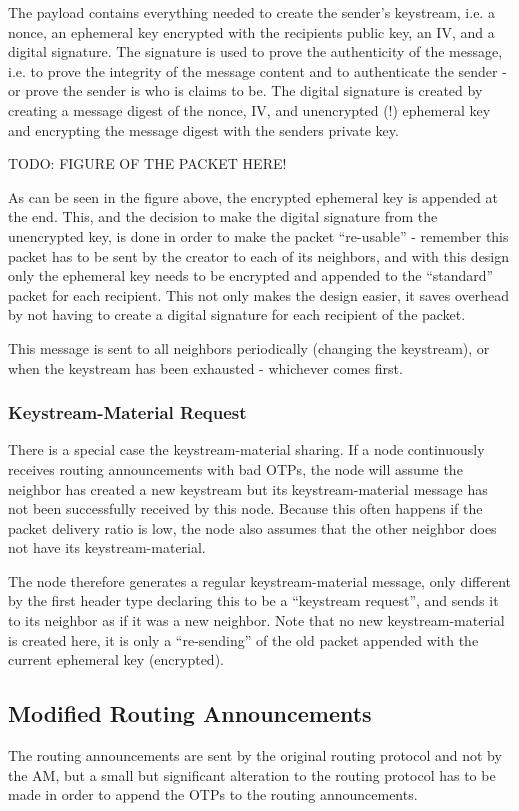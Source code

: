 The payload contains everything needed to create the sender's keystream, i.e. a
nonce, an ephemeral key encrypted with the recipients public key, an IV, and a
digital signature. The signature is used to prove the authenticity of the
message, i.e. to prove the integrity of the message content and to authenticate
the sender - or prove the sender is who is claims to be. The digital signature
is created by creating a message digest of the nonce, IV, and unencrypted (!)
ephemeral key and encrypting the message digest with the senders private key.

TODO: FIGURE OF THE PACKET HERE!

As can be seen in the figure above, the encrypted ephemeral key is appended at
the end. This, and the decision to make the digital signature from the
unencrypted key, is done in order to make the packet ``re-usable'' - remember
this packet has to be sent by the creator to each of its neighbors, and with
this design only the ephemeral key needs to be encrypted and appended to the
``standard'' packet for each recipient. This not only makes the design easier,
it saves overhead by not having to create a digital signature for each recipient
of the packet.

This message is sent to all neighbors periodically (changing the keystream), or
when the keystream has been exhausted - whichever comes first.

\subsubsection*{Keystream-Material Request}
There is a special case the keystream-material sharing. If a node continuously
receives routing announcements with bad \acp{OTP}, the node will assume the
neighbor has created a new keystream but its keystream-material message has not
been successfully received by this node. Because this often happens if the
packet delivery ratio is low, the node also assumes that the other neighbor does
not have its keystream-material.

The node therefore generates a regular keystream-material message, only
different by the first header type declaring this to be a ``keystream request'',
and sends it to its neighbor as if it was a new neighbor. Note that no new
keystream-material is created here, it is only a ``re-sending'' of the old
packet appended with the current ephemeral key (encrypted).

\subsection{Modified Routing Announcements}
The routing announcements are sent by the original routing protocol and not by
the \ac{AM}, but a small but significant alteration to the routing protocol has
to be made in order to append the \acp{OTP} to the routing announcements.


